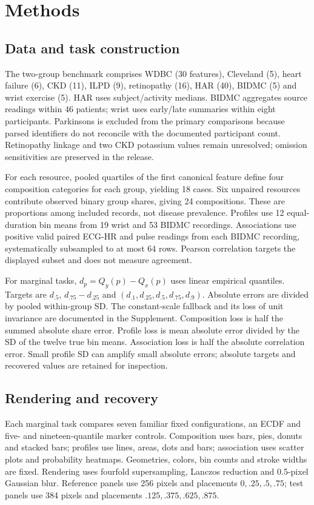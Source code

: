 \documentclass[11pt]{article}
\begin{document}
\section*{Methods}
\subsection*{Data and task construction}
The two-group benchmark comprises WDBC (30 features), Cleveland (5), heart failure (6), CKD (11), ILPD (9), retinopathy (16), HAR (40), BIDMC (5) and wrist exercise (5).\cite{wdbc,heart,failure,kidney,liver,retina,har,bidmc,wrist} HAR uses subject/activity medians. BIDMC aggregates source readings within 46 patients; wrist uses early/late summaries within eight participants.\cite{pimentel2017,jarchi2017} Parkinsons is excluded from the primary comparisons because parsed identifiers do not reconcile with the documented participant count. Retinopathy linkage and two CKD potassium values remain unresolved; omission sensitivities are preserved in the release.

For each resource, pooled quartiles of the first canonical feature define four composition categories for each group, yielding 18 cases. Six unpaired resources contribute observed binary group shares, giving 24 compositions. These are proportions among included records, not disease prevalence. Profiles use 12 equal-duration bin means from 19 wrist and 53 BIDMC recordings. Associations use positive valid paired ECG-HR and pulse readings from each BIDMC recording, systematically subsampled to at most 64 rows. Pearson correlation targets the displayed subset and does not measure agreement.

For marginal tasks, $d_p=Q_y(p)-Q_x(p)$ uses linear empirical quantiles. Targets are $d_{.5}$, $d_{.75}-d_{.25}$ and $(d_{.1},d_{.25},d_{.5},d_{.75},d_{.9})$. Absolute errors are divided by pooled within-group SD. The constant-scale fallback and its loss of unit invariance are documented in the Supplement. Composition loss is half the summed absolute share error. Profile loss is mean absolute error divided by the SD of the twelve true bin means. Association loss is half the absolute correlation error. Small profile SD can amplify small absolute errors; absolute targets and recovered values are retained for inspection.

\subsection*{Rendering and recovery}
Each marginal task compares seven familiar fixed configurations, an ECDF and five- and nineteen-quantile marker controls. Composition uses bars, pies, donuts and stacked bars; profiles use lines, areas, dots and bars; association uses scatter plots and probability heatmaps. Geometries, colors, bin counts and stroke widths are fixed. Rendering uses fourfold supersampling, Lanczos reduction and 0.5-pixel Gaussian blur. Reference panels use 256 pixels and placements $0,.25,.5,.75$; test panels use 384 pixels and placements $.125,.375,.625,.875$.
\end{document}
